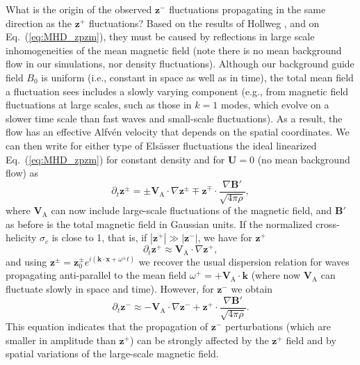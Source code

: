 \documentclass[aip,pop,reprint,amsmath,amssymb,floatfix]{revtex4-1}
\renewcommand{\vec}[1]{\mathbf{#1}}
\begin{document}
What is the origin of the observed $\vec{z}^-$ fluctuations
propagating in the same direction as the $\vec{z}^+$ fluctuations?
Based on the results of Hollweg \cite{hollweg_1990_wkb}, and on
Eq.~(\ref{eq:MHD_zpzm}), they must be caused by reflections in large
scale inhomogeneities of the mean magnetic field (note there is no
mean background flow in our simulations, nor density fluctuations).
Although our background guide field $B_0$ is uniform (i.e., constant
in space as well as in time), the total mean field a fluctuation sees
includes a slowly varying component (e.g., from magnetic field
fluctuations at large scales, such as those in $k=1$ modes, which
evolve on a slower time scale than fast waves and small-scale
fluctuations).  As a result, the flow has an effective Alfv\'en
velocity that depends on the spatial coordinates. We can then write
for either type of Els\"asser fluctuations the ideal linearized
Eq.~(\ref{eq:MHD_zpzm}) for constant density and for $\vec{U}=0$ (no
mean background flow) as
\begin{equation}
\partial_t \vec{z}^\pm = \pm \vec{V}_\textrm{A} \cdot \nabla \vec{z}^\pm 
    \mp \vec{z}^\mp \cdot \frac{\nabla \vec{B}'}{\sqrt{4\pi \rho}} ,
\end{equation}
where $\vec{V}_\textrm{A}$ can now include large-scale fluctuations of
the magnetic field, and $\vec{B}'$ as before is the total magnetic
field in Gaussian units. If the normalized cross-helicity $\sigma_c$ is close to 1,
that is, if $|\vec{z}^+| \gg |\vec{z}^-|$, we have for $\vec{z}^+$
\begin{equation}
\partial_t \vec{z}^+  \approx \vec{V}_\textrm{A} \cdot \nabla \vec{z}^+ ,
\end{equation}
and using $\vec{z}^\pm = \vec{z}_0^\pm e^{i(\vec{k}\cdot
  \vec{x}+\omega^\pm t)}$ we recover the usual dispersion relation for
waves propagating anti-parallel to the mean field $\omega^+ =
+\vec{V}_\textrm{A} \cdot \vec{k}$ (where now $\vec{V}_\textrm{A}$ can
fluctuate slowly in space and time). However, for $\vec{z}^-$ we
obtain
\begin{equation}
\partial_t \vec{z}^- \approx - \vec{V}_\textrm{A} \cdot \nabla \vec{z}^- + \vec{z}^+ 
    \cdot \frac{\nabla \vec{B}'}{\sqrt{4\pi \rho}} .
\label{eq:zmlinear}
\end{equation}
This equation indicates that the propagation of $\vec{z}^-$
perturbations (which are smaller in amplitude than $\vec{z}^+$) can be
strongly affected by the $\vec{z}^+$ field and by spatial variations
of the large-scale magnetic field.
\end{document}
